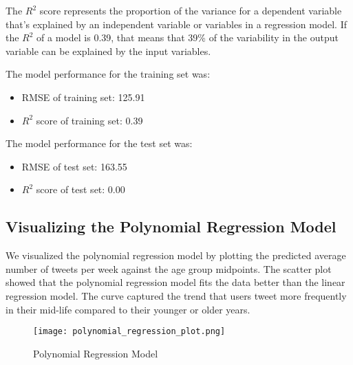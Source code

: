 \documentclass{article}
\begin{document}
The $R^2$ score represents the proportion of the variance for a dependent variable that's explained by an independent variable or variables in a regression model. If the $R^2$ of a model is 0.39, that means that 39\% of the variability in the output variable can be explained by the input variables.

The model performance for the training set was:
\begin{itemize}
\item RMSE of training set: 125.91
\item $R^2$ score of training set: 0.39
\end{itemize}

The model performance for the test set was:
\begin{itemize}
\item RMSE of test set: 163.55
\item $R^2$ score of test set: 0.00
\end{itemize}

\subsection{Visualizing the Polynomial Regression Model}

We visualized the polynomial regression model by plotting the predicted average number of tweets per week against the age group midpoints. The scatter plot showed that the polynomial regression model fits the data better than the linear regression model. The curve captured the trend that users tweet more frequently in their mid-life compared to their younger or older years.

\begin{figure}[H]
\centering
\texttt{[image: polynomial\_regression\_plot.png]}
\caption{Polynomial Regression Model}
\end{figure}
\end{document}
